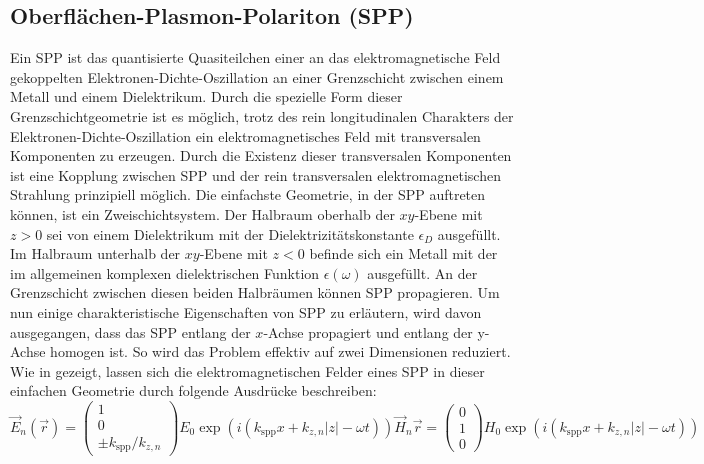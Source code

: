 \documentclass[titlepage,  ngerman]{article}
\begin{document}
	\subsection{Oberflächen-Plasmon-Polariton (SPP)}		
	Ein SPP ist das quantisierte Quasiteilchen einer an das elektromagnetische Feld gekoppelten Elektronen-Dichte-Oszillation an einer Grenzschicht zwischen einem Metall und einem Dielektrikum. Durch die spezielle Form dieser Grenzschichtgeometrie ist es möglich, trotz des rein longitudinalen Charakters der Elektronen-Dichte-Oszillation ein elektromagnetisches Feld mit transversalen Komponenten zu erzeugen. Durch die Existenz dieser transversalen Komponenten ist eine Kopplung zwischen SPP und der rein transversalen elektromagnetischen Strahlung prinzipiell möglich. Die einfachste Geometrie, in der SPP auftreten können, ist ein Zweischichtsystem. Der Halbraum oberhalb der $xy$-Ebene mit $z>0$ sei von einem Dielektrikum mit der Dielektrizitätskonstante $\epsilon_D$ ausgefüllt. Im Halbraum unterhalb der $xy$-Ebene mit $z<0$ befinde sich ein Metall mit der im allgemeinen komplexen dielektrischen Funktion $\epsilon(\omega)$ ausgefüllt. An der Grenzschicht zwischen diesen beiden Halbräumen können SPP propagieren. Um nun einige charakteristische Eigenschaften von SPP zu erläutern, wird davon ausgegangen, dass das SPP entlang der $x$-Achse propagiert und entlang der y-Achse homogen ist. So wird das Problem effektiv auf zwei Dimensionen reduziert. Wie in \cite{Maier.2007} gezeigt, lassen sich die elektromagnetischen Felder eines SPP in dieser einfachen Geometrie durch folgende Ausdrücke beschreiben:
	\begin{subequations}
		\label{eq:fields_spp}
		\begin{equation}
			\label{eq:electric_field_spp}
			\vec{E}_n(\vec{r}) = \begin{pmatrix} 1 \\ 0 \\ \pm k_{\mathrm{spp}}/k_{z,n} \end{pmatrix} E_0 \exp\left(i(k_{\mathrm{spp}}x + k_{z, n}|z|-\omega t)\right)	
		\end{equation}
		\begin{equation}
			\label{eq:magnetic_field_spp}
			\vec{H}_n\vec{r} = \begin{pmatrix} 0 \\ 1 \\ 0 \end{pmatrix} H_0 \exp\left(i(k_{\mathrm{spp}}x + k_{z, n}|z|-\omega t)\right)
		\end{equation}
	\end{subequations}
\end{document}
